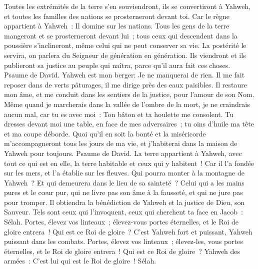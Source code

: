 \begin{multicols}{2}
Toutes les extrémités de la terre s'en souviendront, ils se convertiront à Yahweh, et toutes les familles des nations se prosterneront devant toi.
Car le règne appartient à Yahweh~: Il domine sur les nations.
Tous les gens de la terre mangeront et se prosterneront devant lui~; tous ceux qui descendent dans la poussière s'inclineront, même celui qui ne peut conserver sa vie.
La postérité le servira, on parlera du Seigneur de génération en génération.
Ils viendront et ils publieront sa justice au peuple qui naîtra, parce qu'il aura fait ces choses.
\VerseOne{}Psaume de David. Yahweh est mon berger: Je ne manquerai de rien.
Il me fait reposer dans de verts pâturages, il me dirige près des eaux paisibles.
Il restaure mon âme, et me conduit dans les sentiers de la justice, pour l'amour de son Nom.
Même quand je marcherais dans la vallée de l'ombre de la mort, je ne craindrais aucun mal, car tu es avec moi~: Ton bâton et ta houlette me consolent.
Tu dresses devant moi une table, en face de mes adversaires~; tu oins d'huile ma tête et ma coupe déborde.
Quoi qu'il en soit la bonté et la miséricorde m'accompagneront tous les jours de ma vie, et j'habiterai dans la maison de Yahweh pour toujours.
\VerseOne{}Psaume de David. La terre appartient à Yahweh, avec tout ce qui est en elle, la terre habitable et ceux qui y habitent~!
Car il l'a fondée sur les mers, et l'a établie sur les fleuves.
Qui pourra monter à la montagne de Yahweh~? Et qui demeurera dans le lieu de sa sainteté~?
Celui qui a les mains pures et le cœur pur, qui ne livre pas son âme à la fausseté, et qui ne jure pas pour tromper.
Il obtiendra la bénédiction de Yahweh et la justice de Dieu, son Sauveur.
Tels sont ceux qui l'invoquent, ceux qui cherchent ta face en Jacob~: Sélah.
Portes, élevez vos linteaux~; élevez-vous portes éternelles, et le Roi de gloire entrera~!
Qui est ce Roi de gloire~? C'est Yahweh fort et puissant, Yahweh puissant dans les combats.
Portes, élevez vos linteaux~; élevez-les, vous portes éternelles, et le Roi de gloire entrera~!
Qui est ce Roi de gloire~? Yahweh des armées~: C'est lui qui est le Roi de gloire~! Sélah.

\end{multicols}
